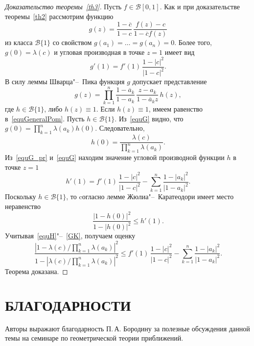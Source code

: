 \documentclass{article}
\theoremstyle{definition}
\theoremstyle{plain}
\begin{document}
\begin{proof}[Доказательство теоремы~\ref{th3}]
	Пусть  $f\in \mathscr B[0,1]$. Как и при доказательстве теоремы~\ref{th2} рассмотрим
	функцию
	\[
	g(z)=\frac{1-\overline{c}}{1-c}\,\frac{f(z)-c}{1-\overline{c}f(z)}
	\]	
	из класса $\mathscr B\{1\}$ со свойством $g(a_1)=\ldots =g(a_n)=0$.
	Более того, $g(0)=\lambda(c)$  и угловая производная в точке $z=1$ имеет вид
	\begin{equation}\label{equG_pr}
		g'(1)=f'(1)\,\frac{1-|c|^2}{|1-c|^2}.
	\end{equation}
	В силу леммы Шварца"--~Пика  функция $g$ допускает представление
	\begin{equation}\label{equG}
		g(z)=
		\prod_{k=1}^{n}
		\frac{1-\overline{a}_k}{1-a_k}\,\frac{z-a_k}{1-\overline{a}_kz}\, h(z),	
	\end{equation}	
	где $h\in \mathscr B\{1\}$, либо $h(z)\equiv 1$. Если $h(z)\equiv 1$, имеем равенство в~\eqref{equGeneralPom}. Пусть $h\in \mathscr B\{1\}$. Из~\eqref{equG} видно, что $g(0)=\prod_{k=1}^{n}\lambda(a_k)h(0)$.
	Следовательно,
	\begin{equation}\label{equH}
		h(0)=\frac{\lambda(c)}{\prod_{k=1}^{n}\lambda(a_k)}.
	\end{equation}
	Из~\eqref{equG_pr} и~\eqref{equG} находим значение угловой производной функции $h$ в точке $z=1$
	\begin{equation}\label{equH_pr}
		h'(1)=
		f'(1)\,\frac{1-|c|^2}{|1-c|^2}-\sum_{k=1}^{n}\frac{1-|a_k|^2}{|1-a_k|^2}.
	\end{equation}
	Поскольку $h\in\mathscr B\{1\}$, то cогласно лемме Жюлиа"--~Каратеодори имеет место неравенство
	\begin{equation}\label{GK}
		\frac{|1-h(0)|^2}{1-|h(0)|^2}\leqslant h'(1).
	\end{equation}
	Учитывая~\eqref{equH}"--~\eqref{GK}, получаем оценку
	\[
	\frac{|1-\lambda (c)/\prod_{k=1}^{n}\lambda(a_k)|^2}{1-|\lambda (c)/\prod_{k=1}^{n}\lambda(a_k)|^2}\leqslant
	f'(1)\,\frac{1-|c|^2}{|1-c|^2}-\sum_{k=1}^{n}\frac{1-|a_k|^2}{|1-a_k|^2}.
	\]
Теорема доказана.
\end{proof}	


\section*{БЛАГОДАРНОСТИ}

Авторы выражают  благодарность П.\,А. Бородину за полезные обсуждения данной темы на семинаре по
геометрической теории приближений.
\end{document}
